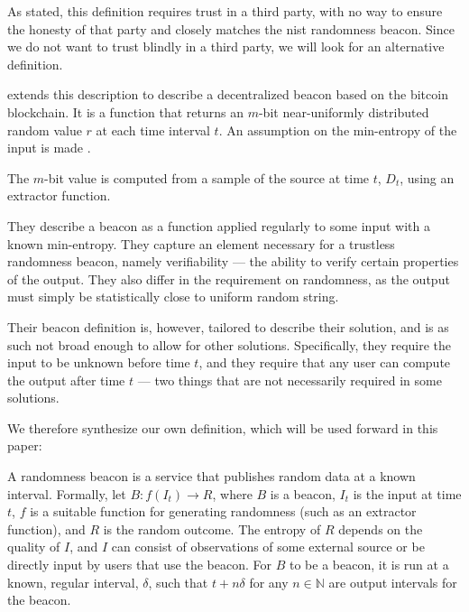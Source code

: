 As stated, this definition requires trust in a third party, with no way to ensure the honesty of that party and closely matches the \gls{nist} randomness beacon.
Since we do not want to trust blindly in a third party, we will look for an alternative definition.

\citet{bonneau2015bitcoin} extends this description to describe a decentralized beacon based on the bitcoin blockchain.
It is a function that returns an $m$-bit near-uniformly distributed random value $r$ at each time interval $t$. An assumption on the min-entropy of the input is made .

The $m$-bit value is computed from a sample of the source at time $t$, $D_t$, using an extractor function. 

They describe a beacon as a function applied regularly to some input with a known min-entropy.
They capture an element necessary for a trustless randomness beacon, namely verifiability --- the ability to verify certain properties of the output.
They also differ in the requirement on randomness, as the output must simply be statistically close to uniform random string.

Their beacon definition is, however, tailored to describe their solution, and is as such not broad enough to allow for other solutions.
Specifically, they require the input to be unknown before time $t$, and they require that any user can compute the output after time $t$ --- two things that are not necessarily required in some solutions.


We therefore synthesize our own definition, which will be used forward in this paper:

A  randomness beacon is a service that publishes random data at a known interval.
Formally, let $B: f(I_t) \rightarrow R$, where $B$ is a beacon, $I_t$ is the input at time $t$, $f$ is a suitable function for generating randomness (such as an extractor function), and $R$ is the random outcome. The entropy of $R$ depends on the quality of $I$, and $I$ can consist of observations of some external source or be directly input by users that use the beacon.
For $B$ to be a beacon, it is run at a known, regular interval, $\delta$, such that $t+n\delta$ for any $n \in \mathbb{N}$ are output intervals for the beacon.

